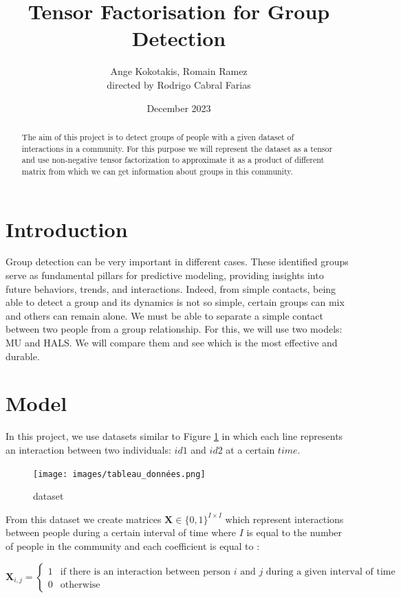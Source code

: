 \documentclass{article}
\title{Tensor Factorisation for Group Detection}
\author{ Ange Kokotakis, Romain Ramez \\ \small directed by Rodrigo Cabral Farias}
\date{December 2023}
\begin{document}
\maketitle

\begin{abstract}
    The aim of this project is to detect groups of people with a given dataset of interactions in a community.
    For this purpose we will represent the dataset as a tensor and use non-negative tensor factorization to approximate
    it as a product of different matrix from which we can get information about groups in this community.
\end{abstract}

\section{Introduction}

Group detection can be very important in different cases. These identified groups serve as fundamental pillars for predictive modeling, providing insights into future behaviors, trends, and interactions.
Indeed, from simple contacts, being able to detect a group and its dynamics is not so simple, certain groups can mix and others can remain alone. We must be able to separate a simple contact between two people from a group relationship.
For this, we will use two models: MU and HALS.
We will compare them and see which is the most effective and durable.

\section{Model}

In this project, we use datasets similar to Figure \ref{dataset} in which each line represents an interaction between
two individuals: $id1$ and $id2$ at a certain $time$.

\begin{figure}[H]
    \centering
    \texttt{[image: images/tableau\_données.png]}
    \caption{dataset}
    \label{dataset}
\end{figure}

From this dataset we create matrices $\mathbf{X} \in \{0, 1\}^{I \times I}$ which represent interactions between people during a certain
interval of time where $I$ is equal to the number of people in the community and each coefficient is equal to :

\[
    \mathbf{X}_{i,j} = 
    \begin{cases}
        1 & \text{if there is an interaction between person $i$ and $j$ during a given interval of time} \\
        0 & \text{otherwise}
    \end{cases}
\]
\end{document}

